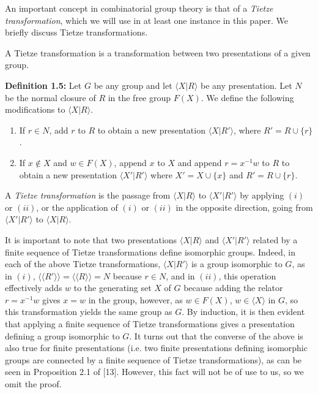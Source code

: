 \documentclass[12pt]{article}
\newcommand{\vs}{\vskip10pt}
\begin{document}
	An important concept in combinatorial group theory is that of a \textit{Tietze transformation}, which we will use in at least one instance in this paper. We briefly discuss Tietze transformations. 
	
	\vs 
	
	A Tietze transformation is a transformation between two presentations of a given group. 
	
	\vs
	
	\textbf{Definition 1.5: } Let $G$ be any group and let $\langle X \vert R \rangle $ be any presentation. Let $N$ be the normal closure of $R$ in the free group $F(X)$. We define the following modifications to $\langle X \vert R \rangle $. 
	
	\begin{enumerate}[label = (\roman*)]
		\item If $r \in N$, add $r$ to $R$ to obtain a new presentation $\langle X \vert R' \rangle$, where $R' = R \cup \{r\}$. 
		\item If $x \notin X$ and $w \in F(X)$, append $x$ to $X$ and append $r = x^{-1}w$ to $R$ to obtain a new presentation $\langle X' \vert R' \rangle$ where $X' = X \cup \{x\}$ and $R' = R \cup \{r\}$. 
	\end{enumerate}

	A \textit{Tietze transformation} is the passage from $\langle X \vert R \rangle$ to $\langle X' \vert R' \rangle$ by applying $(i)$ or $(ii)$, or the application of $(i)$ or $(ii)$ in the opposite direction, going from $\langle X' \vert R' \rangle$ to $\langle X \vert R \rangle$.
	
	\vs

	It is important to note that two presentations $\langle X \vert R \rangle$ and $\langle X' \vert R' \rangle$ related by a finite sequence of Tietze transformations define isomorphic groups. Indeed, in each of the above Tietze transformations, $\langle X \vert R' \rangle$ is a group isomorphic to $G$, as in $(i)$, $\langle \langle R' \rangle \rangle = \langle \langle R \rangle \rangle = N$ because $r \in N$, and in $(ii)$, this operation effectively adds $w$ to the generating set $X$ of $G$ because adding the relator $r = x^{-1}w$ gives $x = w$ in the group, however, as $w \in F(X)$, $w \in \langle X \rangle$ in $G$, so this transformation yields the same group as $G$. By induction, it is then evident that applying a finite sequence of Tietze transformations gives a presentation defining a group isomorphic to $G$. It turns out that the converse of the above is also true for finite presentations (i.e. two finite presentations defining isomorphic groups are connected by a finite sequence of Tietze transformations), as can be seen in Proposition 2.1 of [13]. However, this fact will not be of use to us, so we omit the proof. 
	
\end{document}
